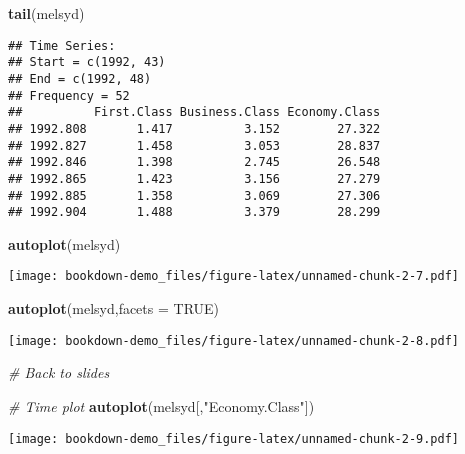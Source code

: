 \documentclass[]{book}
\newenvironment{Shaded}{\begin{snugshade}}{\end{snugshade}}
\newcommand{\CommentTok}[1]{\textcolor[rgb]{0.56,0.35,0.01}{\textit{#1}}}
\newcommand{\DataTypeTok}[1]{\textcolor[rgb]{0.13,0.29,0.53}{#1}}
\newcommand{\KeywordTok}[1]{\textcolor[rgb]{0.13,0.29,0.53}{\textbf{#1}}}
\newcommand{\NormalTok}[1]{#1}
\newcommand{\OperatorTok}[1]{\textcolor[rgb]{0.81,0.36,0.00}{\textbf{#1}}}
\newcommand{\OtherTok}[1]{\textcolor[rgb]{0.56,0.35,0.01}{#1}}
\newcommand{\StringTok}[1]{\textcolor[rgb]{0.31,0.60,0.02}{#1}}
\begin{document}
\begin{Shaded}
\begin{Highlighting}[]
  \KeywordTok{tail}\NormalTok{(melsyd)}
\end{Highlighting}
\end{Shaded}

\begin{verbatim}
## Time Series:
## Start = c(1992, 43) 
## End = c(1992, 48) 
## Frequency = 52 
##          First.Class Business.Class Economy.Class
## 1992.808       1.417          3.152        27.322
## 1992.827       1.458          3.053        28.837
## 1992.846       1.398          2.745        26.548
## 1992.865       1.423          3.156        27.279
## 1992.885       1.358          3.069        27.306
## 1992.904       1.488          3.379        28.299
\end{verbatim}

\begin{Shaded}
\begin{Highlighting}[]
  \KeywordTok{autoplot}\NormalTok{(melsyd)}
\end{Highlighting}
\end{Shaded}

\texttt{[image: bookdown-demo\_files/figure-latex/unnamed-chunk-2-7.pdf]}

\begin{Shaded}
\begin{Highlighting}[]
  \KeywordTok{autoplot}\NormalTok{(melsyd,}\DataTypeTok{facets =} \OtherTok{TRUE}\NormalTok{)}
\end{Highlighting}
\end{Shaded}

\texttt{[image: bookdown-demo\_files/figure-latex/unnamed-chunk-2-8.pdf]}

\begin{Shaded}
\begin{Highlighting}[]
\CommentTok{# Back to slides}
  
  \CommentTok{# Time plot}
  \KeywordTok{autoplot}\NormalTok{(melsyd[,}\StringTok{"Economy.Class"}\NormalTok{])}
\end{Highlighting}
\end{Shaded}

\texttt{[image: bookdown-demo\_files/figure-latex/unnamed-chunk-2-9.pdf]}

\begin{Shaded}
\end{Shaded}
\end{document}

